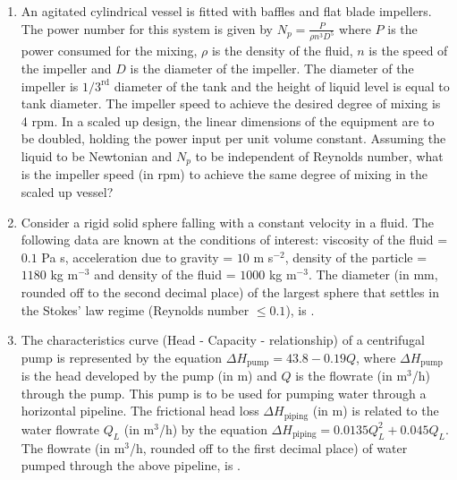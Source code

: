 \documentclass[journal,12pt,onecolumn]{IEEEtran}
\theoremstyle{remark}
\begin{document}
\begin{enumerate}
\item An agitated cylindrical vessel is fitted with baffles and flat blade impellers. The power number for this system is given by $N_p = \frac{P}{\rho n^3 D^5}$ where $P$ is the power consumed for the mixing, $\rho$ is the density of the fluid, $n$ is the speed of the impeller and $D$ is the diameter of the impeller. The diameter of the impeller is $1/3^{\text{rd}}$ diameter of the tank and the height of liquid level is equal to tank diameter. The impeller speed to achieve the desired degree of mixing is 4 rpm. In a scaled up design, the linear dimensions of the equipment are to be doubled, holding the power input per unit volume constant. Assuming the liquid to be Newtonian and $N_p$ to be independent of Reynolds number, what is the impeller speed (in rpm) to achieve the same degree of mixing in the scaled up vessel?
\hfill{}
\begin{enumerate}
\end{enumerate}

\item Consider a rigid solid sphere falling with a constant velocity in a fluid. The following data are known at the conditions of interest: viscosity of the fluid = $0.1$ Pa s, acceleration due to gravity = $10$ m s$^{-2}$, density of the particle = $1180$ kg m$^{-3}$ and density of the fluid = $1000$ kg m$^{-3}$. The diameter (in mm, rounded off to the second decimal place) of the largest sphere that settles in the Stokes' law regime (Reynolds number $\leq 0.1$), is \underline{\hspace{1cm}}.\hfill{}

\item The characteristics curve (Head - Capacity - relationship) of a centrifugal pump is represented by the equation $\Delta H_{\text{pump}} = 43.8 - 0.19Q$, where $\Delta H_{\text{pump}}$ is the head developed by the pump (in m) and $Q$ is the flowrate (in m$^3$/h) through the pump. This pump is to be used for pumping water through a horizontal pipeline. The frictional head loss $\Delta H_{\text{piping}}$ (in m) is related to the water flowrate $Q_L$ (in m$^3$/h) by the equation $\Delta H_{\text{piping}} = 0.0135Q_L^2 + 0.045Q_L$. The flowrate (in m$^3$/h, rounded off to the first decimal place) of water pumped through the above pipeline, is \underline{\hspace{1cm}}.
\hfill{}


\end{enumerate}
\end{document}

